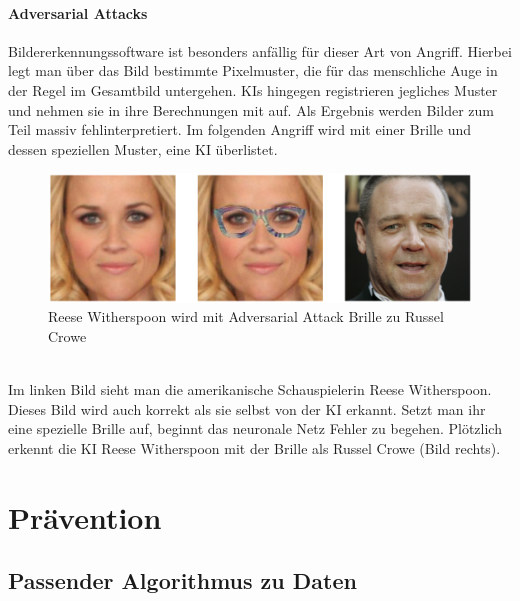 \documentclass[12pt,oneside,a4paper,parskip]{scrbook}
\begin{document}
\subsubsection{Adversarial Attacks}
Bildererkennungssoftware ist besonders anfällig für dieser Art von Angriff. 
Hierbei legt man über das Bild bestimmte Pixelmuster, die für das menschliche Auge in der Regel im Gesamtbild untergehen. KIs hingegen registrieren jegliches Muster und nehmen sie in ihre Berechnungen mit auf. Als Ergebnis werden Bilder zum Teil massiv fehlinterpretiert.
Im folgenden Angriff wird mit einer Brille und dessen speziellen Muster, eine KI überlistet.
\label{section:BrilleAttack}
\begin{figure}[h]
	\begin{center}
		\includegraphics[width=15cm]{Bilder/Brille_Adversarial_Attack.png}
		\caption{Reese Witherspoon wird mit Adversarial Attack Brille zu Russel Crowe}
		\label{fig:BrilleAttack}
	\end{center}
\end{figure}
\\Im linken Bild sieht man die amerikanische Schauspielerin Reese Witherspoon. Dieses Bild wird auch korrekt als sie selbst von der KI erkannt. Setzt man ihr eine spezielle Brille auf, beginnt das neuronale Netz Fehler zu begehen. Plötzlich erkennt die KI Reese Witherspoon mit der Brille als Russel Crowe (Bild rechts).

\chapter{Prävention}
\label{chapter:main}
\section{Passender Algorithmus zu Daten}
\end{document}
